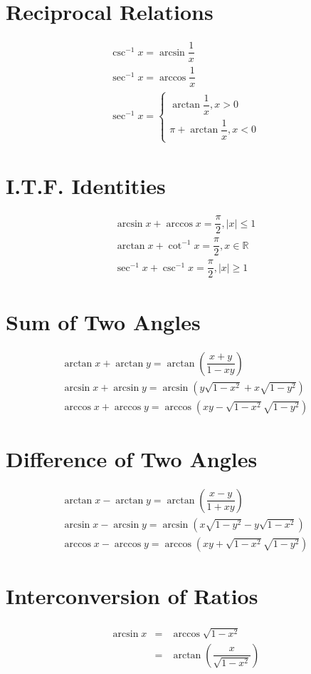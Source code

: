\section{Reciprocal Relations}
\begin{align}
	\csc^{-1} x=\arcsin \dfrac{1}{x}\\
	\sec^{-1} x=\arccos \dfrac{1}{x}\\
	\sec^{-1} x=\begin{cases}
		\arctan \dfrac{1}{x}, x>0\\
		\pi+\arctan \dfrac{1}{x}, x<0
	\end{cases}
\end{align}

\section{I.T.F. Identities}
\begin{align}
	\arcsin x+\arccos x=\dfrac{\pi}{2}, \lvert x \rvert \leq 1\\
	\arctan x+\cot^{-1} x=\dfrac{\pi}{2}, x\in\mathbb{R}\\
	\sec^{-1} x+\csc^{-1} x=\dfrac{\pi}{2}, \lvert x \rvert \geq 1
\end{align}

\section{Sum of Two Angles}
\begin{align}
	\arctan x+\arctan y=\arctan \left(\dfrac{x+y}{1-xy}\right)\\
	\arcsin x+\arcsin y=\arcsin (y\sqrt{1-x^2}+x\sqrt{1-y^2})\\
	\arccos x+\arccos y=\arccos (xy-\sqrt{1-x^2}\sqrt{1-y^2})
\end{align}

\section{Difference of Two Angles}
\begin{align}
	\arctan x-\arctan y=\arctan \left(\dfrac{x-y}{1+xy}\right)\\
	\arcsin x-\arcsin y=\arcsin (x\sqrt{1-y^2}-y\sqrt{1-x^2})\\
	\arccos x-\arccos y=\arccos (xy+\sqrt{1-x^2}\sqrt{1-y^2})
\end{align}

\section{Interconversion of Ratios}
\begin{equation}
	\begin{aligned}
		\begin{split}
			\arcsin x & = & \arccos \sqrt{1-x^2}\\
			& = & \arctan \left(\dfrac{x}{\sqrt{1-x^2}}\right)
		\end{split}
	\end{aligned}
\end{equation}

